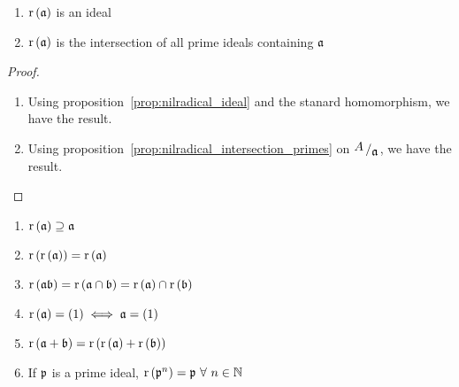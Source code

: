 \begin{proposition}{}{}
	\begin{enumerate}
		\item \( \operatorname{r} \left( \mathfrak{a} \right) \) is an ideal
		\item \( \operatorname{r} \left( \mathfrak{a} \right) \) is the
			intersection of all prime ideals containing \( \mathfrak{a} \)
	\end{enumerate}
\end{proposition}

\begin{proof}
	\
	\begin{enumerate}
		\item Using proposition~\ref{prop:nilradical_ideal} and the
			stanard homomorphism, we have the result.
		\item Using proposition~\ref{prop:nilradical_intersection_primes}
			on \( \bigslant{A}{\mfa} \), we have the result.
	\end{enumerate}
\end{proof}

\begin{proposition}{}{}
	\begin{enumerate}
		\item \( \operatorname{r} \left( \mathfrak{a} \right) \supseteq \mathfrak{a} \)
		\item \( \operatorname{r} \left( \operatorname{r} \left( \mathfrak{a} \right) \right) = \operatorname{r} \left( \mathfrak{a} \right) \)
		\item \( \operatorname{r} \left( \mathfrak{a} \mathfrak{b} \right) = \operatorname{r} \left( \mathfrak{a} \cap \mathfrak{b} \right)
			= \operatorname{r} \left( \mathfrak{a} \right) \cap \operatorname{r} \left( \mathfrak{b} \right) \)
		\item \( \operatorname{r} \left( \mathfrak{a} \right) = \left( 1 \right) \iff \mathfrak{a} = \left( 1 \right) \)
		\item \( \operatorname{r} \left( \mathfrak{a} + \mathfrak{b} \right) = \operatorname{r} \left( \operatorname{r} \left( \mathfrak{a} \right) +
			\operatorname{r} \left( \mathfrak{b} \right) \right) \)
		\item If \( \mathfrak{p} \) is a prime ideal,
			\( \rad \brak{\mfp^n} = \mfp \ \forall\ n \in \NN \)
	\end{enumerate}
\end{proposition}

